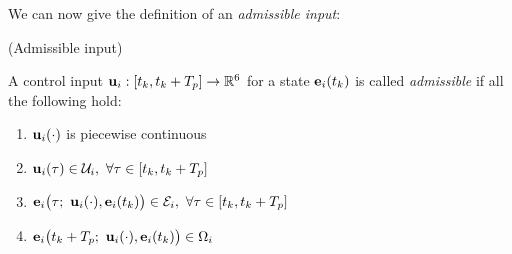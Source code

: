 We can now give the definition of an \textit{admissible input}:

\begin{bw_box}
\begin{definition} (Admissible input)
  \label{definition:admissible_input}

  A control input $\bm{\mathbf{u}}_i : [t_k, t_k + T_p] \to \mathbb{R}^6$ for a state
  $\bm{\mathbf{e}}_i(t_k)$ is called \textit{admissible} if all the following hold:

  \begin{enumerate}
    \item $\bm{\mathbf{u}}_i(\cdot)$ is piecewise continuous
    \item $\vect{u}_i(\tau) \in \mathcal{U}_i,\ \forall \tau \in [t_k, t_k + T_p]$
    \item $\vect{e}_i\big(\tau;\ \vect{u}_i(\cdot), \vect{e}_i(t_k)\big) \in \mathcal{E}_i,\ \forall \tau \in [t_k, t_k + T_p]$
    \item $\vect{e}_i\big(t_k + T_p;\ \vect{u}_i(\cdot), \vect{e}_i(t_k)\big) \in \Omega_i$
  \end{enumerate}

\end{definition}
\end{bw_box}
